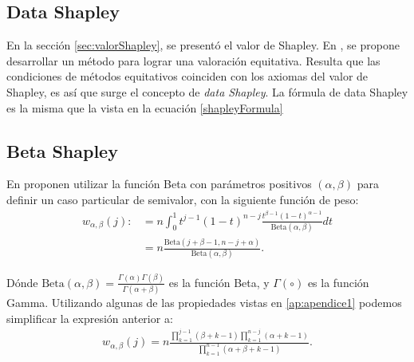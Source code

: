 \subsection*{Data Shapley}
En la sección \ref{sec:valorShapley}, se presentó
el valor de Shapley. En \cite{shapleyValue}, se propone
desarrollar un método para lograr una valoración equitativa.
Resulta que las condiciones de métodos equitativos coinciden
con los axiomas del valor de Shapley, es así que surge
el concepto de \emph{data Shapley}.
La fórmula de data Shapley es la misma que la vista
en la ecuación \ref{shapleyFormula}





\subsection*{Beta Shapley}
En \cite{betaShapley} proponen  utilizar la función Beta con
parámetros positivos $(\alpha,\beta)$ para definir
un caso particular de semivalor, con la siguiente función de peso:
\begin{equation*}
  \begin{split}
    w_{\alpha, \beta}(j) :&= n \int_{0}^{1} t^{j-1}(1-t)^{n-j}
    \frac{t^{\beta-1}(1-t)^{\alpha-1}}{\text{Beta}(\alpha,\beta)}dt\\
    &= n\frac{\text{Beta}(j+\beta-1, n-j+\alpha)}
  {\text{Beta}(\alpha,\beta)}.
  \end{split}
\end{equation*}
 
Dónde $\text{Beta}(\alpha,\beta) = \frac{\Gamma(\alpha)\Gamma(\beta)}
{\Gamma(\alpha+\beta)}$ es la función Beta, y $\Gamma(\circ)$ es
la función Gamma. Utilizando algunas de las propiedades vistas
en \ref{ap:apendice1} podemos simplificar la expresión anterior a:
\begin{equation*}
  \begin{split}
  \label{eq:pesoBeta}
  w_{\alpha, \beta}(j) = n\frac{\prod_{k=1}^{j-1}(\beta+k-1)
  \prod_{k=1}^{n-j}(\alpha+k-1)}
  {\prod_{k=1}^{n-1}(\alpha+\beta+k-1)}.
  \end{split}
\end{equation*}

